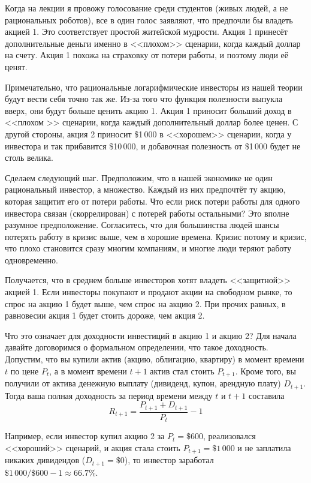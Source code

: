 Когда на лекции я провожу голосование среди студентов (живых людей, а не рациональных роботов), все в один голос заявляют, что предпочли бы владеть акцией 1. Это соответствует простой житейской мудрости. Акция 1 принесёт дополнительные деньги именно в <<плохом>> сценарии, когда каждый доллар на счету. Акция 1 похожа на страховку от потери работы, и поэтому люди её ценят.

Примечательно, что  рациональные логарифмические инвесторы из нашей теории будут вести себя точно так же. Из-за того что функция полезности выпукла вверх, они будут больше ценить акцию 1. Акция 1 приносит больший доход в <<плохом >> сценарии, когда каждый дополнительный доллар более ценен. С другой стороны, акция 2 приносит \$1\,000 в <<хорошем>> сценарии, когда у инвестора и так прибавится \$10\,000, и добавочная полезность от \$1\,000 будет не столь велика.

Сделаем следующий шаг. Предположим, что в нашей экономике не один рациональный инвестор, а множество. Каждый из них предпочтёт ту акцию, которая защитит его от потери работы. Что если риск потери работы для одного инвестора связан (скоррелирован) с потерей работы остальными?  Это вполне разумное предположение. Согласитесь, что для большинства людей шансы потерять работу в кризис выше, чем в хорошие времена. Кризис потому и кризис, что плохо становится сразу многим компаниям, и многие люди теряют работу одновременно.

Получается, что в среднем больше инвесторов хотят владеть <<защитной>> акцией 1. Если инвесторы покупают и продают акции на свободном рынке, то спрос на акцию 1 будет выше, чем спрос на акцию 2. При прочих равных, в равновесии акция 1 будет стоить дороже, чем акция 2.

Что это означает для доходности инвестиций в акцию 1 и акцию 2? Для начала давайте договоримся о формальном определении, что такое доходность. Допустим, что вы купили актив (акцию, облигацию, квартиру) в момент времени $t$ по цене $P_t$, а в момент времени $t+1$ актив стал стоить $P_{t+1}$. Кроме того, вы получили от актива денежную выплату (дивиденд, купон, арендную плату) $D_{t+1}$. Тогда ваша полная доходность за период времени между $t$ и $t+1$ составила
\begin{equation}
R_{t+1} = \dfrac{P_{t+1} + D_{t+1}}{P_t} - 1
\label{total_return_formula}
\end{equation}

Например, если инвестор купил акцию 2 за $P_t = \$600$, реализовался <<хороший>> сценарий, и акция стала стоить $P_{t+1} = \$1\,000$ и не заплатила никаких дивидендов ($D_{t+1} = \$0$), то инвестор заработал $\$1\,000/\$600 - 1 \approx 66.7\%$.

